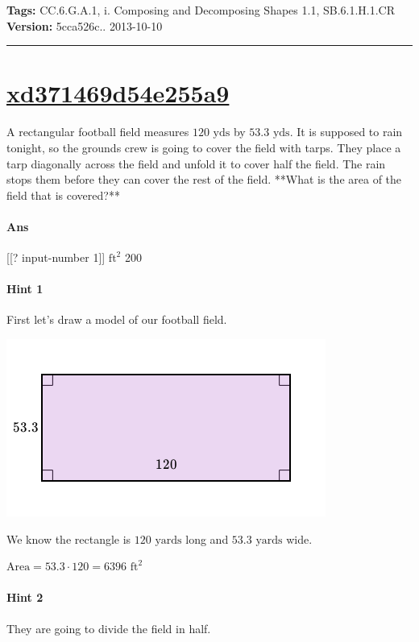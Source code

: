 \documentclass[twocolumn,10pt]{article}
\def\shrinkfactor{0.55}
\begin{document}
\medskip
\noindent
\textbf{Tags:} {\footnotesize CC.6.G.A.1, i.	Composing and Decomposing Shapes 1.1, SB.6.1.H.1.CR}\\
\textbf{Version:} 5cca526c.. 2013-10-10
\smallskip\hrule





\section{\href{https://www.khanacademy.org/devadmin/content/items/xd371469d54e255a9}{xd371469d54e255a9}}

\noindent
A rectangular football field measures $120\text{ yds}$ by $53.3\text{ yds}$.  It is supposed to rain tonight, so the grounds crew is going to cover the field with tarps.  They place a tarp diagonally across the field and unfold it to cover half the field.  The rain stops them before they can cover the rest of the field.  **What is the area of the field that is covered?**  

\paragraph{Ans}  [[? input-number 1]] $\text{ft}^2$  200

\paragraph{Hint 1}First let's draw a model of our football field.  



\includegraphics[scale=\shrinkfactor]{figures/52bc5e71a419cdd5ee5b8a5faf3880eea3afb1eb.png}  

We know the rectangle is $120\text{ yards}$ long and $53.3 \text{ yards}$ wide.  

${\text{Area}}=53.3\cdot120=6396\text{ ft}^2$  

\paragraph{Hint 2}They are going to divide the field in half.  
\end{document}
